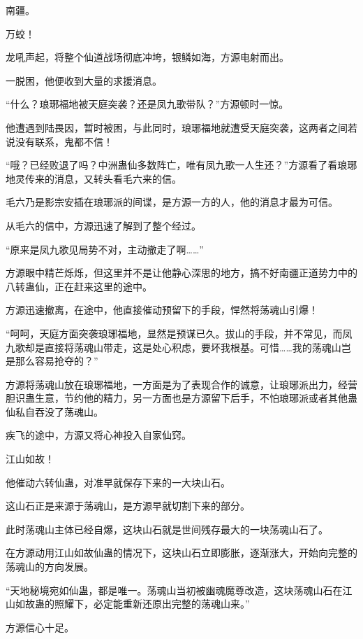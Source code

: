 
\begin{this_body}

南疆。

万蛟！

龙吼声起，将整个仙道战场彻底冲垮，银鳞如海，方源电射而出。

一脱困，他便收到大量的求援消息。

“什么？琅琊福地被天庭突袭？还是凤九歌带队？”方源顿时一惊。

他遭遇到陆畏因，暂时被困，与此同时，琅琊福地就遭受天庭突袭，这两者之间若说没有联系，鬼都不信！

“哦？已经败退了吗？中洲蛊仙多数阵亡，唯有凤九歌一人生还？”方源看了看琅琊地灵传来的消息，又转头看毛六来的信。

毛六乃是影宗安插在琅琊派的间谍，是方源一方的人，他的消息才最为可信。

从毛六的信中，方源迅速了解到了整个经过。

“原来是凤九歌见局势不对，主动撤走了啊……”

方源眼中精芒烁烁，但这里并不是让他静心深思的地方，搞不好南疆正道势力中的八转蛊仙，正在赶来这里的途中。

方源迅速撤离，在途中，他直接催动预留下的手段，悍然将荡魂山引爆！

“呵呵，天庭方面突袭琅琊福地，显然是预谋已久。拔山的手段，并不常见，而凤九歌却是直接将荡魂山带走，这是处心积虑，要坏我根基。可惜……我的荡魂山岂是那么容易抢夺的？”

方源将荡魂山放在琅琊福地，一方面是为了表现合作的诚意，让琅琊派出力，经营胆识蛊生意，节约他的精力，另一方面也是方源留下后手，不怕琅琊派或者其他蛊仙私自吞没了荡魂山。

疾飞的途中，方源又将心神投入自家仙窍。

江山如故！

他催动六转仙蛊，对准早就保存下来的一大块山石。

这山石正是来源于荡魂山，是方源早就切割下来的部分。

此时荡魂山主体已经自爆，这块山石就是世间残存最大的一块荡魂山石了。

在方源动用江山如故仙蛊的情况下，这块山石立即膨胀，逐渐涨大，开始向完整的荡魂山的方向发展。

“天地秘境宛如仙蛊，都是唯一。荡魂山当初被幽魂魔尊改造，这块荡魂山石在江山如故蛊的照耀下，必定能重新还原出完整的荡魂山来。”

方源信心十足。


\end{this_body}
